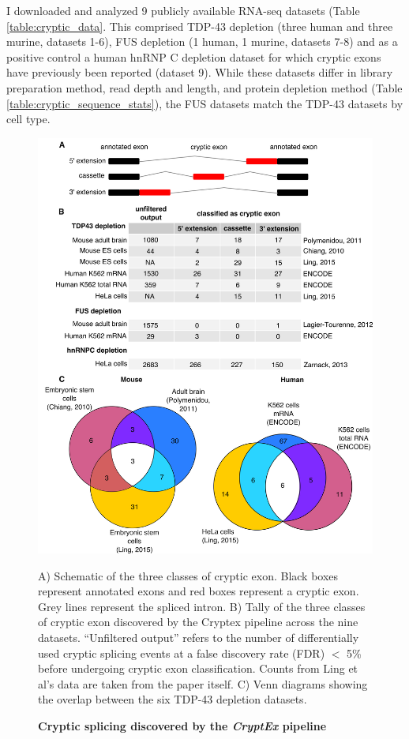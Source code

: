 I downloaded and analyzed 9 publicly available RNA-seq datasets (Table \ref{table:cryptic_data}. 
This comprised TDP-43 depletion (three human and three murine, datasets 1-6), FUS depletion (1 human, 1 murine, datasets 7-8) and as a positive control a human hnRNP C depletion dataset for which cryptic exons have previously been reported (dataset 9).  
While these datasets differ in library preparation method, read depth and length, and protein depletion method (Table \ref{table:cryptic_sequence_stats}), the FUS datasets match the TDP-43 datasets by cell type. 

\begin{figure}[h!]
	\centering
	\includegraphics[width=\textwidth]{Figures/03_cryptic_exons/Figure_1_venn_inkscape.png}
	\caption{\textbf{Cryptic splicing discovered by the \emph{CryptEx} pipeline}}
	A) Schematic of the three classes of cryptic exon. Black boxes represent annotated exons and red boxes represent a cryptic exon. Grey lines represent the spliced intron. B) Tally of the three classes of cryptic exon discovered by the Cryptex pipeline across the nine datasets. ``Unfiltered output'' refers to the number of differentially used cryptic splicing events at a false discovery rate (FDR) $<$ 5\% before undergoing cryptic exon classification. Counts from Ling et al's data are taken from the paper itself. C) Venn diagrams showing the overlap between the six TDP-43 depletion datasets.
	\label{fig:cryptic_venn}
\end{figure}

